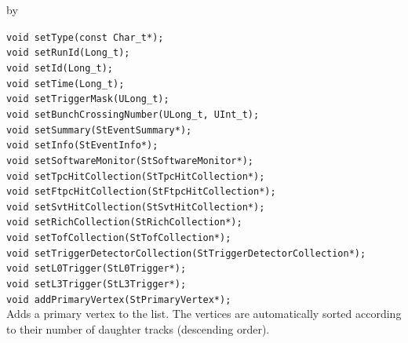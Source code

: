 \documentclass[twoside]{article}
\newcommand{\entrylabel}[1]{\mbox{\textbf{{#1}}}\hfil}%
\newenvironment{entry}
{\begin{list}{}%
    {\renewcommand{\makelabel}{\entrylabel}%
     \setlength{\labelwidth}{90pt}%
     \setlength{\leftmargin}{\labelwidth}
     \advance\leftmargin by \labelsep%
      }%
    }%
  {\end{list}}
\newcommand{\Entrylabel}[1]%
{\raisebox{0pt}[1ex][0pt]{\makebox[\labelwidth][l]%
    {\parbox[t]{\labelwidth}{\hspace{0pt}\textbf{{#1}}}}}}
\newenvironment{Entry}%
{\renewcommand{\entrylabel}{\Entrylabel}\begin{entry}}%
  {\end{entry}}
\begin{document}
\begin{Entry}
    
    \verb+void setType(const Char_t*);+\\

    \verb+void setRunId(Long_t);+\\

    \verb+void setId(Long_t);+\\

    \verb+void setTime(Long_t);+\\

    \verb+void setTriggerMask(ULong_t);+\\

    \verb+void setBunchCrossingNumber(ULong_t, UInt_t);+\\

    \verb+void setSummary(StEventSummary*);+\\

    \verb+void setInfo(StEventInfo*);+\\

    \verb+void setSoftwareMonitor(StSoftwareMonitor*);+\\

    \verb+void setTpcHitCollection(StTpcHitCollection*);+\\

    \verb+void setFtpcHitCollection(StFtpcHitCollection*);+\\

    \verb+void setSvtHitCollection(StSvtHitCollection*);+\\

    \verb+void setRichCollection(StRichCollection*);+\\

    \verb+void setTofCollection(StTofCollection*);+\\

    \verb+void setTriggerDetectorCollection(StTriggerDetectorCollection*);+\\

    \verb+void setL0Trigger(StL0Trigger*);+\\
    
    \verb+void setL3Trigger(StL3Trigger*);+\\
    
    \verb+void addPrimaryVertex(StPrimaryVertex*);+\\
    Adds a primary vertex to the list. The vertices are
    automatically sorted according to their number of daughter
    tracks (descending order). 
    
\end{Entry}
\clearpage
\end{document}
